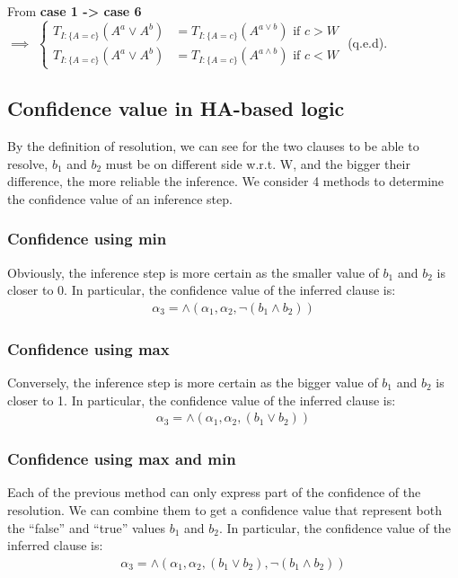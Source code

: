 \documentclass[part1.tex]{subfiles}
\begin{document}
\paragraph{} From {\bfseries case 1 -> case 6}\\
$\implies$ \(
   \begin{cases}
           T_{I:\{A = c\}}(A^{a} \vee A^{b}) &=  T_{I:\{A =
           c\}}(A^{a \vee b})  \text{ if } c > W \\

           T_{I:\{A = c\}}(A^{a} \vee A^{b}) &=  T_{I:\{A =
           c\}}(A^{a \wedge b}) \text{ if } c < W
   \end{cases} 
   \) (q.e.d).

\subsection{Confidence value in HA-based logic}
By the definition of resolution, we can see for the two clauses to be able to resolve, \(b_1\) and 
\(b_2\) must be on different side w.r.t. W, and the bigger their difference, the more reliable the 
inference. We consider 4 methods to determine the confidence value of an inference step.\\
\subsubsection{Confidence using min}
Obviously, the inference step is more certain as the smaller value of \(b_1\) and \(b_2\) is closer to 
0. In particular, the confidence value of the inferred clause is:
\begin{align*}
	{\alpha}_3 = \wedge({\alpha}_1, {\alpha}_2, \neg(b_1 \wedge b_2))
\end{align*}
\subsubsection{Confidence using max}
Conversely, the inference step is more certain as the bigger value of \(b_1\) and \(b_2\) is closer to 
1. In particular, the confidence value of the inferred clause is:
\begin{align*}
	{\alpha}_3 = \wedge({\alpha}_1, {\alpha}_2, (b_1 \vee b_2))
\end{align*}
\subsubsection{Confidence using max and min}
Each of the previous method can only express part of the confidence of the resolution. We can combine
them to get a confidence value that represent both the ``false'' and ``true'' values \(b_1\) and 
\(b_2\). In particular, the confidence value of the inferred clause is:
\begin{align*}
	{\alpha}_3 = \wedge({\alpha}_1, {\alpha}_2, (b_1 \vee b_2), \neg(b_1 \wedge b_2))
\end{align*}
\end{document}
